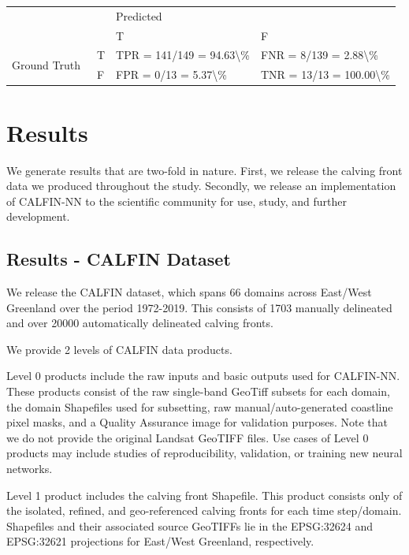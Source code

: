 \documentclass[tc, manuscript]{copernicus}
\begin{document}
\begin{table}[h]
\centering
{}
\label{confusion-matrix}
\begin{tabular}{llll}
                               &   & \multicolumn{2}{l}{Predicted}                                                     \\
                               &   & T                                       & F                                       \\
\multirow{2}{*}{Ground Truth~} & T & TPR = 141/149 = 94.63\textbackslash{}\% & FNR = 8/139 = 2.88\textbackslash{}\%    \\
                               & F & FPR = 0/13 = 5.37\textbackslash{}\%     & TNR = 13/13 = 100.00\textbackslash{}\% 
\end{tabular}
\end{table}



\section{Results}
We generate results that are two-fold in nature. First, we release the calving front data we produced throughout the study. Secondly, we release an implementation of CALFIN-NN to the scientific community for use, study, and further development.

\subsection{Results - CALFIN Dataset}
We release the CALFIN dataset, which spans 66 domains across East/West Greenland over the period 1972-2019. This consists of 1703 manually delineated and over 20000 automatically delineated calving fronts.

We provide 2 levels of CALFIN data products. 

Level 0 products include the raw inputs and basic outputs used for CALFIN-NN. These products consist of the raw single-band GeoTiff subsets for each domain, the domain Shapefiles used for subsetting, raw manual/auto-generated coastline pixel masks, and a Quality Assurance image for validation purposes. Note that we do not provide the original Landsat GeoTIFF files. Use cases of Level 0 products may include studies of reproducibility, validation, or training new neural networks.

Level 1 product includes the calving front Shapefile. This product consists only of the isolated, refined, and geo-referenced calving fronts for each time step/domain. Shapefiles and their associated source GeoTIFFs lie in the EPSG:32624 and EPSG:32621 projections for East/West Greenland, respectively.
\end{document}
